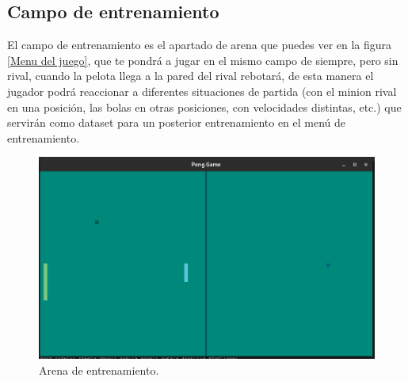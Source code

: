 \subsection{Campo de entrenamiento}
El campo de entrenamiento es el apartado de arena que puedes ver en la figura \ref{Menu del juego}, que te pondrá a jugar en el mismo campo de siempre, pero sin rival, cuando la pelota llega a la pared del rival rebotará, de esta manera el jugador podrá reaccionar a diferentes situaciones de partida (con el minion rival en una posición, las bolas en otras posiciones, con velocidades distintas, etc.) que servirán como dataset para un posterior entrenamiento en el menú de entrenamiento.
\begin{figure}[H]
	\centering
	\includegraphics[width=15cm]{archivos/imagenes/arena-de-entrenamiento.png}
	\caption{Arena de entrenamiento.}
\end{figure}

